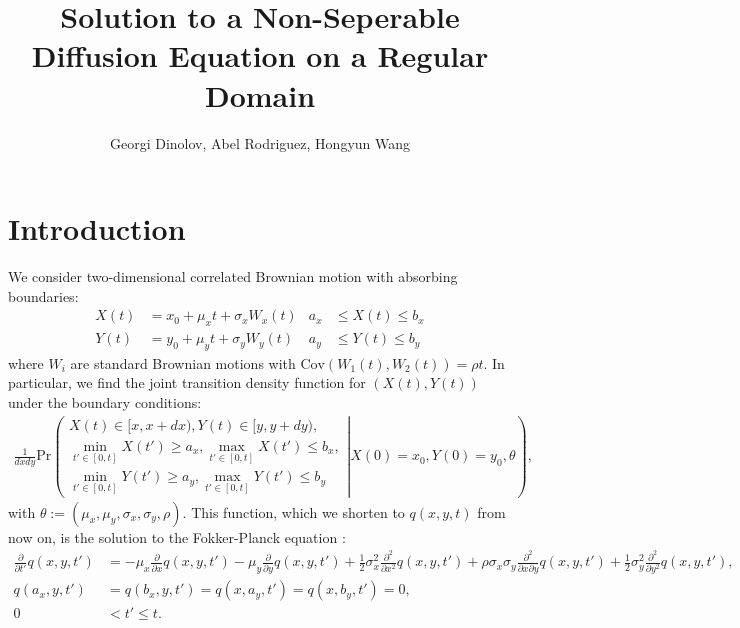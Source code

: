 \documentclass[10pt]{article}
\title{Solution to a Non-Seperable Diffusion Equation on a Regular Domain}
\author{Georgi Dinolov, Abel Rodriguez, Hongyun Wang}
\date{} %
\begin{document}
\def\spacingset#1{\renewcommand{\baselinestretch}%
{#1}\small\normalsize} \spacingset{1}

\bigskip

\vspace{1cm}
\noindent

\spacingset{1.00} %
\section{Introduction}

We consider two-dimensional correlated Brownian motion with absorbing boundaries:
\begin{align}
  X(t) &= x_0 + \mu_x t + \sigma_x W_x(t) &a_x &\leq X(t) \leq b_x   \label{eq:X} \\
  Y(t) &= y_0 + \mu_y t + \sigma_y W_y(t) &a_y &\leq Y(t) \leq b_y   \label{eq:Y} 
\end{align}
where $W_i$ are standard Brownian motions with
$\mbox{Cov}(W_1(t), W_2(t)) = \rho t$. In
particular, we find the joint transition density function for
$(X(t), Y(t))$ under the boundary conditions:
\begin{align}
  \frac{1}{dx dy} \mbox{Pr}\left( \left. \begin{array}{ll}
X(t) \in [x, x+dx), Y(t) \in [y, y+dy),  \\
\displaystyle \min_{t'\in[0, t]} X(t') \ge a_x, \max_{t'\in[0, t]} X(t') \le b_x, \\
\displaystyle \min_{t'\in[0, t]} Y(t') \ge a_y, \max_{t'\in[0, t]} Y(t') \le b_y
\end{array} \right | X(0)=x_0, Y(0)=y_0, \theta
\right), \label{eq:CDF}
\end{align}
with $\theta := (\mu_x, \mu_y, \sigma_x, \sigma_y, \rho).$ This
function, which we shorten to $q(x,y,t)$ from now on, is the solution
to the Fokker-Planck equation \citep{oksendal2013stochastic}:
\begin{align}
  \displaystyle \frac{\partial}{\partial t'} q(x,y,t') &= -\mu_x \frac{\partial}{\partial x}q(x,y,t')
                                         - \mu_y \frac{\partial}{\partial y}q(x,y,t')
                                         + \frac{1}{2}\sigma_x^2 \frac{\partial^2}{\partial x^2}q(x,y,t')
                                         + \rho\sigma_x\sigma_y \frac{\partial^2}{\partial x \partial y}q(x,y,t')
                                         + \frac{1}{2}\sigma_y^2 \frac{\partial^2}{\partial y^2}q(x,y,t'),
  \label{eq:1} \\
  q(a_x, y,t') &= q(b_x,y,t') = q(x,a_y,t') = q(x,b_y,t') = 0, \label{eq:2} \\
   0 &< t' \leq t. \nonumber
\end{align}
\end{document}
